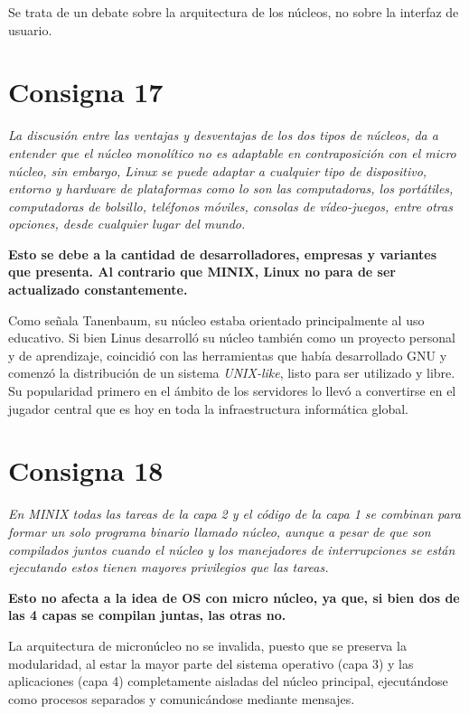 \documentclass[11pt]{article}
\begin{document}
Se trata de un debate sobre la arquitectura de los núcleos, no sobre la interfaz
de usuario.

\section*{Consigna 17}

\emph{
La discusión entre las ventajas y desventajas de los dos tipos de núcleos, da a
entender que el núcleo monolítico no es adaptable en contraposición con el micro
núcleo, sin embargo, Linux se puede adaptar a cualquier tipo de dispositivo,
entorno y hardware de plataformas como lo son las computadoras, los portátiles,
computadoras de bolsillo, teléfonos móviles, consolas de vídeo-juegos, entre
otras opciones, desde cualquier lugar del mundo.
}

\textbf{Esto se debe a la cantidad de desarrolladores, empresas y variantes que
presenta. Al contrario que MINIX, Linux no para de ser actualizado
constantemente.}

Como señala Tanenbaum, su núcleo estaba orientado principalmente al uso
educativo. Si bien Linus desarrolló su núcleo también como un proyecto personal 
y de aprendizaje, coincidió con las herramientas que había desarrollado GNU y 
comenzó la distribución de un sistema \emph{UNIX-like}, listo para ser utilizado 
y libre. Su popularidad primero en el ámbito de los servidores lo llevó a
convertirse en el jugador central que es hoy en toda la infraestructura
informática global.

\section*{Consigna 18}

\emph{
    En MINIX todas las tareas de la capa 2 y el código de la capa 1 se combinan
    para formar un solo programa binario llamado núcleo, aunque a pesar de que
    son compilados juntos cuando el núcleo y los manejadores de interrupciones
    se están ejecutando estos tienen mayores privilegios que las tareas.
}

\textbf{
    Esto no afecta a la idea de OS con micro núcleo, ya que, si bien dos de las
    4 capas se compilan juntas, las otras no.
}

La arquitectura de micronúcleo no se invalida, puesto que se preserva la 
modularidad, al estar la mayor parte del sistema operativo (capa 3) y las 
aplicaciones (capa 4) completamente aisladas del núcleo principal, ejecutándose 
como procesos separados y comunicándose mediante mensajes.
\end{document}

